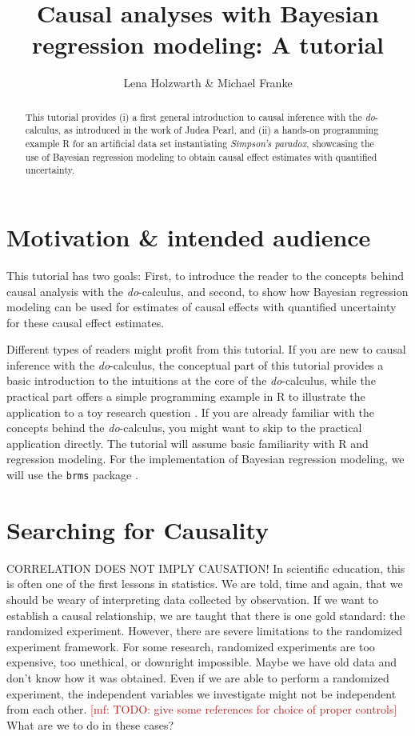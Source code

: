 \documentclass[nobib]{tufte-handout}
\title{Causal analyses with Bayesian regression modeling: A tutorial}
\author{Lena Holzwarth \& Michael Franke}
\date{}
\renewcommand{\mf}[1]{\textcolor{firebrick}{[mf: #1]}}
\newcommand{\docalc}{\emph{do}-calculus\xspace}
\begin{document}
\maketitle

\begin{abstract}
\noindent 
This tutorial provides (i) a first general introduction to causal inference with the \docalc, as introduced in the work of Judea Pearl, and (ii) a hands-on programming example R for an artificial data set instantiating \emph{Simpson's paradox}, showcasing the use of Bayesian regression modeling to obtain causal effect estimates with quantified uncertainty.
\end{abstract}

\section{Motivation \& intended audience}

This tutorial has two goals: First, to introduce the reader to the concepts behind causal analysis with the \docalc \citep{pearl2000models}, and second, to show how Bayesian regression modeling can be used for estimates of causal effects with quantified uncertainty for these causal effect estimates.

Different types of readers might profit from this tutorial.
If you are new to causal inference with the \docalc, the conceptual part of this tutorial provides a basic introduction to the intuitions at the core of the \docalc, while the practical part offers a simple programming example in R to illustrate the application to a toy research question \citep{R}. 
If you are already familiar with the concepts behind the \docalc, you might want to skip to the practical application directly. 
The tutorial will assume basic familiarity with R and regression modeling. 
For the implementation of Bayesian regression modeling, we will use the \texttt{brms} package \citep{brms}.

\section{Searching for Causality}

CORRELATION DOES NOT IMPLY CAUSATION! 
In scientific education, this is often one of the first lessons in statistics. 
We are told, time and again, that we should be weary of interpreting data collected by observation. 
If we want to establish a causal relationship, we are taught that there is one gold standard: the randomized experiment.
However, there are severe limitations to the randomized experiment framework. 
For some research, randomized experiments are too expensive, too unethical, or downright impossible. 
Maybe we have old data and don't know how it was obtained. 
Even if we are able to perform a randomized experiment, the independent variables we investigate might not be independent from each other. \mf{TODO: give some references for choice of proper controls}
What are we to do in these cases?
\end{document}
